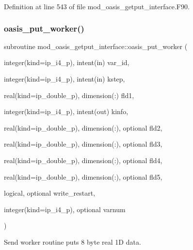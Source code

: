 Definition at line 543 of file mod\+\_\+oasis\+\_\+getput\+\_\+interface.\+F90.

\mbox{\label{namespacemod__oasis__getput__interface_a13fcf0d2a7c31cfbbb24087d24c4f851}} 
\subsubsection{\texorpdfstring{oasis\+\_\+put\+\_\+worker()}{oasis\_put\_worker()}}
{\footnotesize\ttfamily subroutine mod\+\_\+oasis\+\_\+getput\+\_\+interface\+::oasis\+\_\+put\+\_\+worker (\begin{DoxyParamCaption}\item[{integer(kind=ip\+\_\+i4\+\_\+p), intent(in)}]{var\+\_\+id,  }\item[{integer(kind=ip\+\_\+i4\+\_\+p), intent(in)}]{kstep,  }\item[{real(kind=ip\+\_\+double\+\_\+p), dimension(\+:)}]{fld1,  }\item[{integer(kind=ip\+\_\+i4\+\_\+p), intent(out)}]{kinfo,  }\item[{real(kind=ip\+\_\+double\+\_\+p), dimension(\+:), optional}]{fld2,  }\item[{real(kind=ip\+\_\+double\+\_\+p), dimension(\+:), optional}]{fld3,  }\item[{real(kind=ip\+\_\+double\+\_\+p), dimension(\+:), optional}]{fld4,  }\item[{real(kind=ip\+\_\+double\+\_\+p), dimension(\+:), optional}]{fld5,  }\item[{logical, optional}]{write\+\_\+restart,  }\item[{integer(kind=ip\+\_\+i4\+\_\+p), optional}]{varnum }\end{DoxyParamCaption})\hspace{0.3cm}{\ttfamily [private]}}



Send worker routine puts 8 byte real 1D data. 


